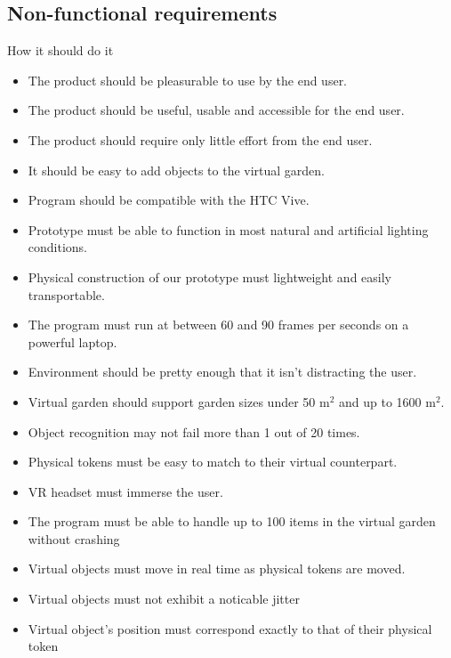 				\subsection{Non-functional requirements}
					How it should do it\\
					\begin{itemize}
						\item The product should be pleasurable to use by the end user.
						\item The product should be useful, usable and accessible for the end user.
						\item The product should require only little effort from the end user.
						\item It should be easy to add objects to the virtual garden.
						\item Program should be compatible with the HTC Vive.
						\item Prototype must be able to function in most natural and artificial lighting conditions.
						\item Physical construction of our prototype must lightweight and easily transportable.
						\item The program must run at between 60 and 90 frames per seconds on a powerful laptop.
						\item Environment should be pretty enough that it isn't distracting the user. 
						\item Virtual garden should support garden sizes under 50 m$^2$ and up to 1600 m$^2$.
						\item Object recognition may not fail more than 1 out of 20 times.
						\item Physical tokens must be easy to match to their virtual counterpart.
						\item VR headset must immerse the user.
						\item The program must be able to handle up to 100 items in the virtual garden without crashing
						\item Virtual objects must move in real time as physical tokens are moved.
						\item Virtual objects must not exhibit a noticable jitter
						\item Virtual object's position must correspond exactly to that of their physical token
					\end{itemize}
			